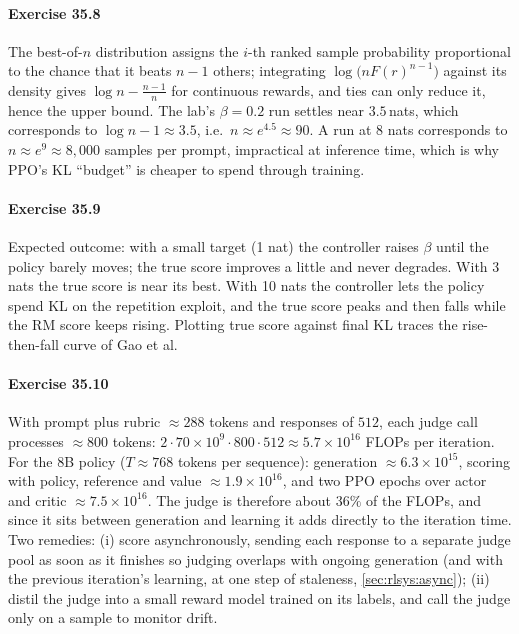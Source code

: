\paragraph{Exercise 35.8} The best-of-$n$ distribution assigns the $i$-th ranked sample
probability proportional to the chance that it beats $n-1$ others; integrating
$\log\big(n F(r)^{n-1}\big)$ against its density gives $\log n-\frac{n-1}{n}$ for continuous rewards, and
ties can only reduce it, hence the upper bound. The lab's $\beta=0.2$ run settles near
$3.5$\,nats, which corresponds to $\log n-1\approx3.5$, i.e.\ $n\approx e^{4.5}\approx90$. A run at 8 nats
corresponds to $n\approx e^9\approx8{,}000$ samples per prompt, impractical at inference time, which is why
PPO's KL ``budget'' is cheaper to spend through training.

\paragraph{Exercise 35.9} Expected outcome: with a small target (1 nat) the controller raises $\beta$ until the
policy barely moves; the true score improves a little and never degrades. With 3 nats the true score is near
its best. With 10 nats the controller lets the policy spend KL on the repetition exploit, and the
true score peaks and then falls while the RM score keeps rising. Plotting true score against final KL
traces the rise-then-fall curve of Gao et al.

\paragraph{Exercise 35.10} With prompt plus rubric $\approx288$ tokens and responses of $512$, each judge call
processes $\approx800$ tokens: $2\cdot70\times10^9\cdot800\cdot512\approx5.7\times10^{16}$ FLOPs per iteration.
For the 8B policy ($T\approx768$ tokens per sequence): generation $\approx6.3\times10^{15}$, scoring with
policy, reference and value $\approx1.9\times10^{16}$, and two PPO epochs over actor and critic
$\approx7.5\times10^{16}$. The judge is therefore about $36\%$ of the FLOPs, and since it sits between
generation and learning it adds directly to the iteration time. Two remedies: (i) score
asynchronously, sending each response to a separate judge pool as soon as it finishes so judging overlaps
with ongoing generation (and with the previous iteration's learning, at one step of staleness,
\cref{sec:rlsys:async}); (ii) distil the judge into a small reward model trained on its labels, and call the
judge only on a sample to monitor drift.
